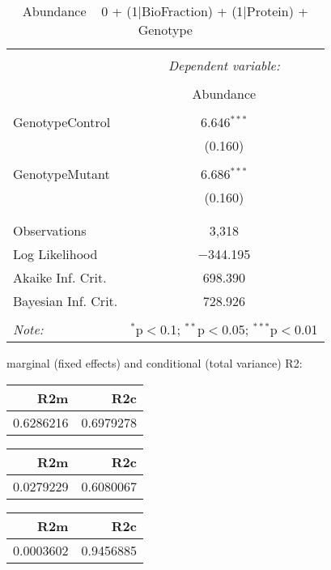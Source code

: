 \documentclass[11pt]{report}
\begin{document}
\begin{table}[!htbp] \centering 
  \caption{Abundance ~ 0 + (1|BioFraction) + (1|Protein) + Genotype} 
  \label{} 
\begin{tabular}{@{\extracolsep{5pt}}lc} 
\\[-1.8ex]\hline 
\hline \\[-1.8ex] 
 & \multicolumn{1}{c}{\textit{Dependent variable:}} \\ 
\cline{2-2} 
\\[-1.8ex] & Abundance \\ 
\hline \\[-1.8ex] 
 GenotypeControl & 6.646$^{***}$ \\ 
  & (0.160) \\ 
  & \\ 
 GenotypeMutant & 6.686$^{***}$ \\ 
  & (0.160) \\ 
  & \\ 
\hline \\[-1.8ex] 
Observations & 3,318 \\ 
Log Likelihood & $-$344.195 \\ 
Akaike Inf. Crit. & 698.390 \\ 
Bayesian Inf. Crit. & 728.926 \\ 
\hline 
\hline \\[-1.8ex] 
\textit{Note:}  & \multicolumn{1}{r}{$^{*}$p$<$0.1; $^{**}$p$<$0.05; $^{***}$p$<$0.01} \\ 
\end{tabular} 
\end{table} 
marginal (fixed effects) and conditional (total variance) R2:

\begin{tabular}{r|r}
\hline
R2m & R2c\\
\hline
0.6286216 & 0.6979278\\
\hline
\end{tabular}

\begin{tabular}{r|r}
\hline
R2m & R2c\\
\hline
0.0279229 & 0.6080067\\
\hline
\end{tabular}

\begin{tabular}{r|r}
\hline
R2m & R2c\\
\hline
0.0003602 & 0.9456885\\
\hline
\end{tabular}
\end{document}
